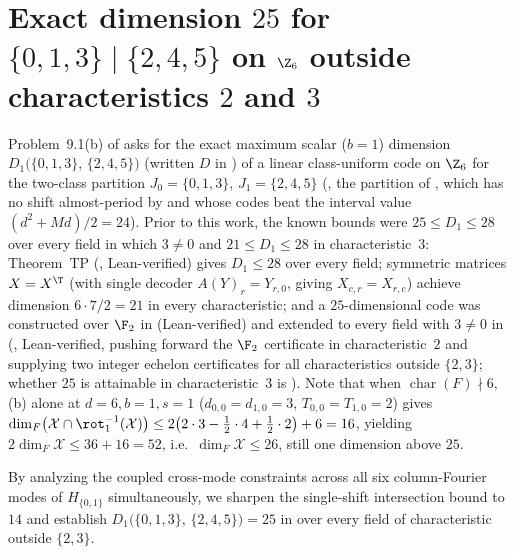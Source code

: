 \section{Exact dimension \texorpdfstring{$25$}{25} for \texorpdfstring{$\{0,1,3\} \mid \{2,4,5\}$}{\{0,1,3\} | \{2,4,5\}} on \texorpdfstring{$\Z_6$}{Z\_6} outside characteristics \texorpdfstring{$2$}{2} and \texorpdfstring{$3$}{3}}\label{sec:aperiodic-six}

Problem~9.1(b) of \cite{SeventeenthPaper2026} asks for the exact maximum scalar ($b = 1$) dimension
$D_1\bigl(\{0,1,3\},\,\{2,4,5\}\bigr)$ (written $D$ in \cite{SeventeenthPaper2026}) of a linear
class-uniform code on $\Z_6$ for the two-class partition $J_0 = \{0,1,3\}$, $J_1 = \{2,4,5\}$
(, the partition of \cite[Proposition~8.2]{SeventeenthPaper2026},
which has no shift almost-period by \cite[Remark~8.1(c)]{SeventeenthPaper2026} and whose codes beat
the interval value $(d^2 + Md)/2 = 24$). Prior to this work, the known bounds were $25 \le D_1 \le 28$ over every
field in which $3 \ne 0$ and $21 \le D_1 \le 28$ in characteristic~$3$: Theorem~TP
(\cite[Theorem~6.4]{SeventeenthPaper2026}, Lean-verified) gives $D_1 \le 28$ over every field;
symmetric matrices $X = X^{\T}$ (with single decoder $A(Y)_r = Y_{r,0}$, giving $X_{c,r} = X_{r,c}$)
achieve dimension $6 \cdot 7 / 2 = 21$ in every characteristic; and a $25$-dimensional code was
constructed over $\F_2$ in \cite[Proposition~8.2]{SeventeenthPaper2026} (Lean-verified) and extended
to every field with $3 \ne 0$ in \cite[Theorem~3.2]{ClassUniformMemo2026}
(, Lean-verified, pushing forward the $\F_2$
certificate in characteristic~$2$ and supplying two integer echelon certificates for all
characteristics outside $\{2, 3\}$; whether $25$ is attainable in characteristic~$3$ is
\cite[Problem~6.1]{ClassUniformMemo2026}).
Note that when $\operatorname{char}(F) \nmid 6$, (b) alone at
$d = 6, b = 1, s = 1$ ($d_{0,0} = d_{1,0} = 3$, $T_{0,0} = T_{1,0} = 2$) gives
$\dim_F\bigl(\mathcal{X} \cap \rot_1^{-1}(\mathcal{X})\bigr) \le
2\bigl(2\cdot 3 - \frac{1}{2}\cdot 4 + \frac{1}{2}\cdot 2\bigr) + 6 = 16$, yielding
$2\dim_F\mathcal{X} \le 36 + 16 = 52$, i.e.\ $\dim_F\mathcal{X} \le 26$, still one dimension above $25$.

By analyzing the coupled cross-mode constraints across all six column-Fourier modes of $H_{\{0,1\}}$
simultaneously, we sharpen the single-shift intersection bound to $14$ and establish
$D_1\bigl(\{0,1,3\},\,\{2,4,5\}\bigr) = 25$ in \cite[Problem~9.1(b)]{SeventeenthPaper2026} over every
field of characteristic outside $\{2, 3\}$.

